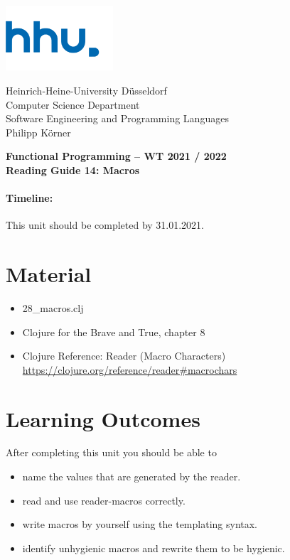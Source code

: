 \documentclass[11pt,a4paper]{article}
\begin{document}
\begin{minipage}[b]{\textwidth}
	\parbox[t]{5cm}{%
		\includegraphics[width=4cm]{unilogo}
		\hfill
	}
	\parbox[b]{11cm}{%
		Heinrich-Heine-University D\"usseldorf\\
		Computer Science Department\\
		Software Engineering and Programming Languages\\
		Philipp K\"orner
	}
\end{minipage}
\begin{center}
	\bf
	Functional Programming -- WT 2021 / 2022\\
	Reading Guide 14: Macros
\end{center}

\pagestyle{empty}

\paragraph{Timeline:} This unit should be completed by 31.01.2021.

\section{Material} 

\begin{itemize}
    \item 28\_macros.clj
	\item Clojure for the Brave and True, chapter 8
	\item Clojure Reference: Reader (Macro Characters) \url{https://clojure.org/reference/reader#macrochars}
\end{itemize}


\section{Learning Outcomes}

After completing this unit you should be able to

\begin{itemize}
    \item name the values that are generated by the reader.
    \item read and use reader-macros correctly.
    \item write macros by yourself using the templating syntax.
    \item identify unhygienic macros and rewrite them to be hygienic.
\end{itemize}
\end{document}
